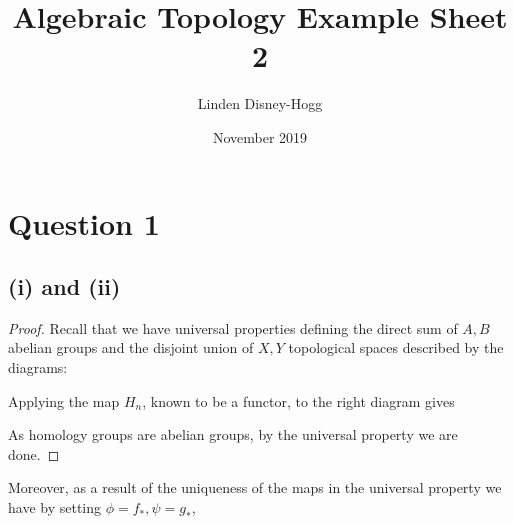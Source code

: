 \documentclass{article}
\title{Algebraic Topology Example Sheet 2}
\author{Linden Disney-Hogg}
\date{November 2019}
\begin{document}
\maketitle
\tableofcontents

\section{Question 1}
\subsection{(i) and (ii)}
\begin{prop}
\end{prop}
\begin{proof}
Recall that we have universal properties defining the direct sum of $A,B$ abelian groups and the disjoint union of $X, Y$ topological spaces described by the diagrams:
\begin{center}
\end{center}
Applying the map $H_n$, known to be a functor, to the right diagram gives 
\begin{center}
\end{center}
As homology groups are abelian groups, by the universal property we are done.
\end{proof}
Moreover, as a result of the uniqueness of the maps in the universal property we have by setting $\phi =f_\ast, \psi = g_\ast$,
\end{document}
